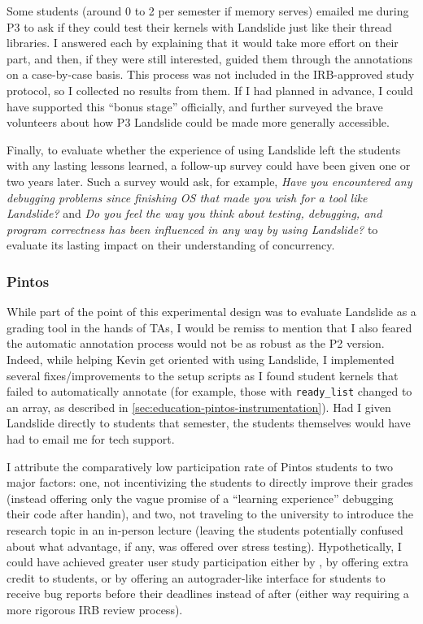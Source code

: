 Some students (around 0 to 2 per semester if memory serves)
emailed me during P3
to ask if they could test their kernels with Landslide just like their thread libraries.
I answered each by explaining that it would take more effort on their part,
and then, if they were still interested,
guided them through the annotations on a case-by-case basis.
This process was not included in the IRB-approved study protocol,
so I collected no results from them.
If I had planned in advance, I could have supported this ``bonus stage'' officially,
and further surveyed the brave volunteers about how P3 Landslide could be made more generally accessible.

Finally, to evaluate whether the experience of using Landslide
left the students with any lasting lessons learned,
a follow-up survey could have been given one or two years later.
Such a survey would ask, for example,
{\em Have you encountered any debugging problems since finishing OS that made you wish for a tool like Landslide?}
and
{\em Do you feel the way you think about testing, debugging, and program correctness
has been influenced in any way by using Landslide?}
to evaluate its lasting impact on their understanding of concurrency.

\subsubsection{Pintos}

While part of the point of this experimental design was to evaluate Landslide as a grading tool in the hands of TAs,
I would be remiss 
to mention that I also feared the automatic annotation process would not be as robust as the P2 version.
Indeed, while helping Kevin get oriented with using Landslide,
I implemented
several
fixes/improvements to the setup scripts
as I found student kernels that failed to automatically annotate
(for example, those with {\tt ready\_list} changed to an array,
as described in \cref{sec:education-pintos-instrumentation}).
Had I given Landslide directly to students that semester,
the students themselves would have had to email me for tech support.

I attribute the comparatively low participation rate of Pintos students to two major factors:
one, not incentivizing the students to directly improve their grades
(instead offering only the vague promise of a ``learning experience'' debugging their code after handin),
and two, not traveling to the university to introduce the research topic in an in-person lecture
(leaving the students potentially confused about what advantage, if any, was offered over stress testing).
Hypothetically, I could have achieved greater user study participation
either by ,
by offering extra credit to students,
or by offering an autograder-like interface for students to receive bug reports before their deadlines instead of after
(either way requiring a more rigorous IRB review process).

